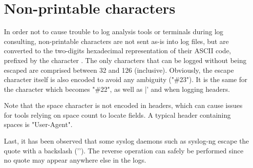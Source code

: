 
\section{Non-printable characters}

In order not to cause trouble to log analysis tools or terminals during log
consulting, non-printable characters are not sent as-is into log files, but are
converted to the two-digits hexadecimal representation of their ASCII code,
prefixed by the character \CHAR{\#}. The only characters that can be logged without
being escaped are comprised between 32 and 126 (inclusive). Obviously, the
escape character \CHAR{\#} itself is also encoded to avoid any ambiguity ("\#23"). It
is the same for the character  which becomes "\#22", as well as |' and
\CHAR{\}} when logging headers.


Note that the space character \CHAR{~} is not encoded in headers, which can cause
issues for tools relying on space count to locate fields. A typical header
containing spaces is "User-Agent".


Last, it has been observed that some syslog daemons such as syslog-ng escape
the quote  with a backslash ('\bslash '). The reverse operation can safely be
performed since no quote may appear anywhere else in the logs.

